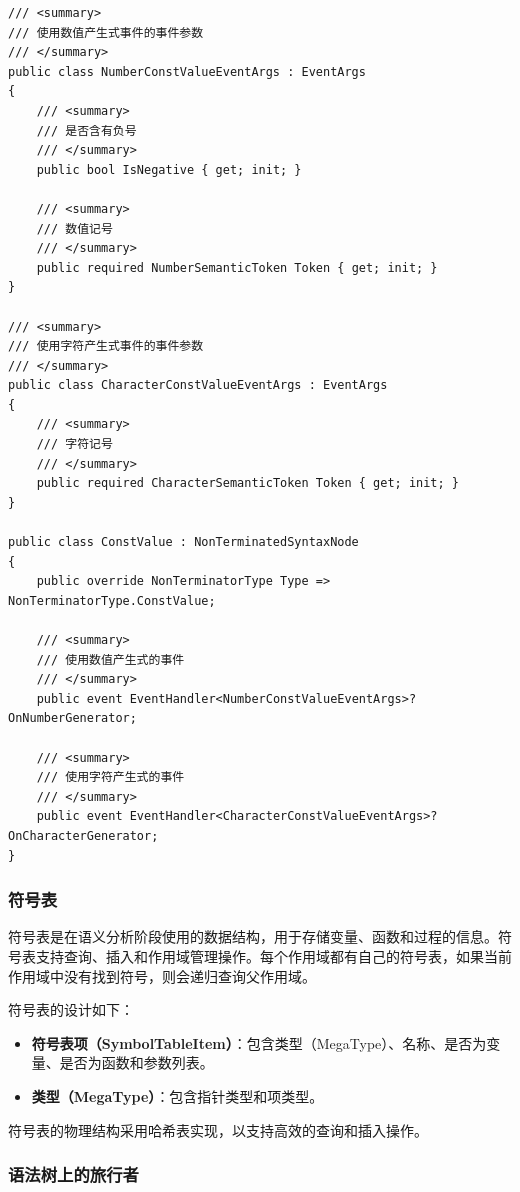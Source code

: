 \documentclass[../main.tex]{subfiles}
\begin{document}
\begin{lstlisting}[style=csharp]
/// <summary>
/// 使用数值产生式事件的事件参数
/// </summary>
public class NumberConstValueEventArgs : EventArgs
{
    /// <summary>
    /// 是否含有负号
    /// </summary>
    public bool IsNegative { get; init; }

    /// <summary>
    /// 数值记号
    /// </summary>
    public required NumberSemanticToken Token { get; init; }
}

/// <summary>
/// 使用字符产生式事件的事件参数
/// </summary>
public class CharacterConstValueEventArgs : EventArgs
{
    /// <summary>
    /// 字符记号
    /// </summary>
    public required CharacterSemanticToken Token { get; init; }
}

public class ConstValue : NonTerminatedSyntaxNode
{
    public override NonTerminatorType Type => NonTerminatorType.ConstValue;

    /// <summary>
    /// 使用数值产生式的事件
    /// </summary>
    public event EventHandler<NumberConstValueEventArgs>? OnNumberGenerator;

    /// <summary>
    /// 使用字符产生式的事件
    /// </summary>
    public event EventHandler<CharacterConstValueEventArgs>? OnCharacterGenerator;
}
\end{lstlisting}

\subsubsection{符号表}

符号表是在语义分析阶段使用的数据结构，用于存储变量、函数和过程的信息。符号表支持查询、插入和作用域管理操作。每个作用域都有自己的符号表，如果当前作用域中没有找到符号，则会递归查询父作用域。

符号表的设计如下：

\begin{itemize}
    \item \textbf{符号表项（SymbolTableItem）}：包含类型（MegaType）、名称、是否为变量、是否为函数和参数列表。
    \item \textbf{类型（MegaType）}：包含指针类型和项类型。
\end{itemize}

符号表的物理结构采用哈希表实现，以支持高效的查询和插入操作。

\subsubsection{语法树上的旅行者}
\end{document}
